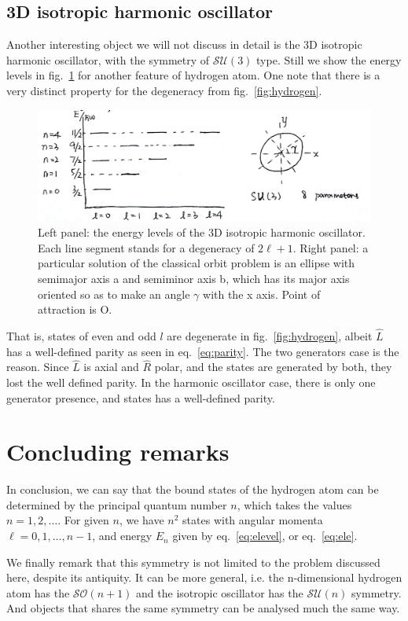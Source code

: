 \documentclass[a4paper,11pt]{article}
\theoremstyle{remark}
\theoremstyle{defn}
\begin{document}
\subsection{3D isotropic harmonic oscillator}
Another interesting object we will not discuss in detail is the 3D isotropic harmonic oscillator, with
the symmetry of $\mathcal{SU}(3)$ type. Still we show the energy levels in fig.~\ref{fig:sho} for
another feature of hydrogen atom. One note that there is a very distinct property for the degeneracy
from fig.~\ref{fig:hydrogen}.\par  
\begin{figure}
\centering
\includegraphics[width=\linewidth]{sho}
\caption{Left panel: the energy levels of the 3D isotropic harmonic oscillator. Each line segment stands for a degeneracy of $2\ell+1$. 
Right panel: a particular solution of the classical orbit problem is an ellipse
with semimajor axis a and semiminor axis b, which has its major axis
oriented so as to make an angle $\gamma$ with the x axis. Point of attraction is O.}
\label{fig:sho}
\end{figure}
That is, states of even and odd $l$ are degenerate in fig.~\ref{fig:hydrogen}, albeit $\hat{L}$ has
a well-defined parity as seen in eq.~\ref{eq:parity}.
The two generators case is the reason. Since $\hat{L}$ is axial and $\hat{R}$ polar, and the states are 
generated by both, they lost the well defined parity. In the harmonic oscillator case, there is only one 
generator presence, and states has a well-defined parity.

\section{Concluding remarks}
In conclusion, we can say that the bound states of the hydrogen atom can be determined
by the principal quantum number $n$, which takes the values $n = 1, 2,\ldots$. For
given $n$, we have $n^2$ states with angular momenta $\ell = 0, 1, \ldots , n-1$, and energy $E_n$
given by eq.~\eqref{eq:elevel}, or eq.~\eqref{eq:ele}.\par  
We finally remark that this symmetry is not limited to the problem discussed here, despite its antiquity. 
It can be more general, i.e. the n-dimensional hydrogen atom has the $\mathcal{SO}(n+1)$ and the isotropic oscillator has the $\mathcal{SU}(n)$ symmetry. And objects that shares the same symmetry can be analysed
much the same way.
\end{document}
